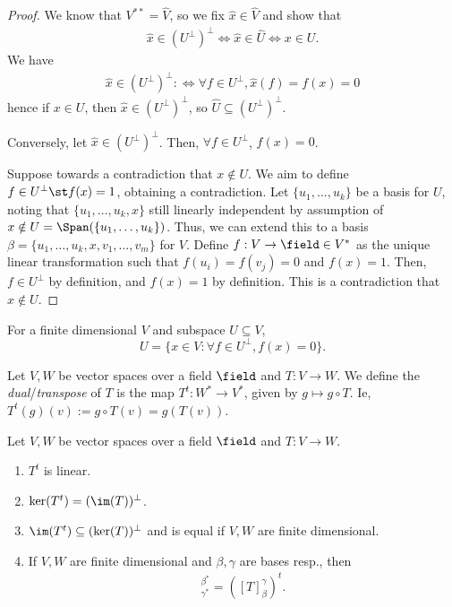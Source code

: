 \begin{proof}
    We know that $V^{\ast \ast} = \hat{V}$, so we fix $\hat{x} \in \hat{V}$ and show that \begin{align*}
        \hat{x} \in (U^\perp)^\perp \iff \hat{x} \in \hat {U} \iff x \in U.
    \end{align*}
We have 
    \begin{align*}
        \hat{x} \in (U^\perp)^\perp :\iff \forall f \in U^\perp, \hat{x}(f) = f(x) = 0
    \end{align*}
    hence if $x \in U$, then $\hat{x} \in (U^\perp)^\perp$, so $\hat{U} \subseteq (U^\perp)^\perp$.

    Conversely, let $\hat{x} \in (U^\perp)^\perp$. Then, $\forall f \in U^\perp$, $f(x) = 0$.
    
    Suppose towards a contradiction that $x \notin U$. We aim to define $f \in U^\perp \st f(x) = 1$, obtaining a contradiction. Let $\{u_1, \dots, u_k\}$ be a basis for $U$, noting that $\{u_1, \dots, u_k, x\}$ still linearly independent by assumption of $x \notin U = \Span(\{u_1, \dots, u_k\})$. Thus, we can extend this to a basis $\beta = \{u_1, \dots, u_k, x, v_1, \dots, v_m\}$ for $V$. Define $f :V \to \field \in V^\ast$ as the unique linear transformation such that $f(u_i) = f(v_j) = 0$ and $f(x) = 1$. Then, $f \in U^\perp$ by definition, and $f(x) = 1$ by definition. This is a contradiction that $x \notin U$.
\end{proof}

\begin{corollary}
    For a finite dimensional $V$ and subspace $U \subseteq V$,
    \[
    U = \{x \in V : \forall f \in U^\perp, f(x) = 0\}.
    \]
\end{corollary}

\begin{definition}
    Let $V, W$ be vector spaces over a field $\field$ and $T : V \to W$. We define the \emph{dual}/\emph{transpose} of $T$ is the map $T^t : W^\ast \to V^\ast$, given by $g \mapsto g\circ T$. Ie, $T^t(g)(v) := g \circ T(v) = g(T(v))$.
\end{definition}

\begin{proposition}\label{prop:propertiesoftranspose}
    Let $V, W$ be vector spaces over a field $\field$ and $T : V \to W$. \begin{enumerate}
        \item $T^t$ is linear.
        \item $\ker(T^t) = (\im(T))^\perp$.
        \item $\im(T^t) \subseteq (\ker(T))^\perp$ and is equal if $V, W$ are finite dimensional.
        \item If $V,W$ are finite dimensional and $\beta, \gamma$ are bases resp., then \begin{align*}
            [T^t]_{\gamma^\ast}^{\beta^\ast} = ([T]_\beta^\gamma)^t.
        \end{align*}
    \end{enumerate}
\end{proposition}

